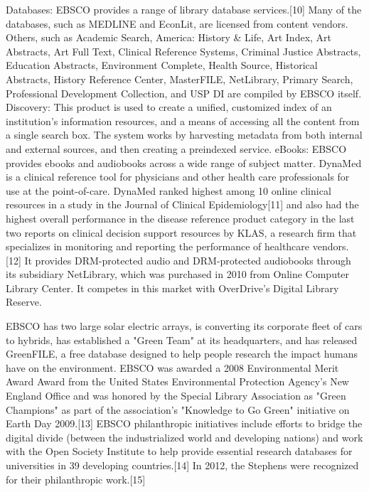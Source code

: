 \begin{enumerate}
		Databases: EBSCO provides a range of library database services.[10] 
		Many of the databases, 
		such as MEDLINE and EconLit, 
		are licensed from content vendors. 
		Others, 
		such as Academic Search, 
		America: History & Life, 
		Art Index, 
		Art Abstracts, 
		Art Full Text, 
		Clinical Reference Systems, 
		Criminal Justice Abstracts, 
		Education Abstracts, 
		Environment Complete, 
		Health Source, 
		Historical Abstracts, 
		History Reference Center, 
		MasterFILE, 
		NetLibrary, 
		Primary Search, 
		Professional Development Collection, 
		and USP DI are compiled by EBSCO itself.
		Discovery: 
		This product is used to create a unified, 
		customized index of an institution's information resources, 
		and a means of accessing all the content from a single search box. 
		The system works by harvesting metadata from both internal and external sources, 
		and then creating a preindexed service.
		eBooks:
		EBSCO provides ebooks and audiobooks across a wide range of subject matter.
		DynaMed is a clinical reference tool for physicians and other health care professionals for use at the point-of-care. 
		DynaMed ranked highest among 10 online clinical resources in a study in the Journal of Clinical Epidemiology[11] 
		and also had the highest overall performance 
		in the disease reference product category 
		in the last two reports on clinical decision support resources by KLAS, 
		a research firm that specializes in monitoring and reporting the performance of healthcare vendors.[12]
		It provides DRM-protected audio and DRM-protected audiobooks through its subsidiary NetLibrary, 
		which was purchased in 2010 from Online Computer Library Center. 
		It competes in this market with OverDrive’s Digital Library Reserve.
		
		EBSCO has two large solar electric arrays, 
		is converting its corporate fleet of cars to hybrids, 
		has established a "Green Team" at its headquarters, 
		and has released GreenFILE, 
		a free database designed to help people research the impact humans have on the environment. 
		EBSCO was awarded a 2008 Environmental Merit Award Award 
		from the United States Environmental Protection Agency's New England Office 
		and was honored by the Special Library Association as "Green Champions" 
		as part of the association's "Knowledge to Go Green" initiative on Earth Day 2009.[13]
		EBSCO philanthropic initiatives include efforts to bridge the digital divide 
		(between the industrialized world and developing nations) 
		and work with the Open Society Institute 
		to help provide essential research databases 
		for universities in 39 developing countries.[14] 
		In 2012, the Stephens were recognized for their philanthropic work.[15]
		

\end{enumerate}
